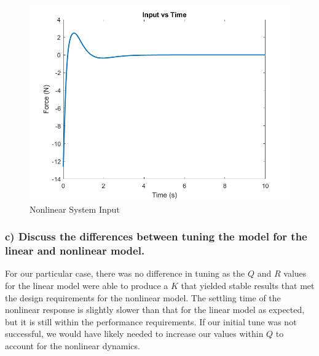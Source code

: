 \begin{figure}[!ht]
    \centering
    \includegraphics[width=\linewidth]{figs/sf_nlin_input.png}
    \caption{Nonlinear System Input}
    \label{}
\end{figure}

\clearpage

\subsubsection*{c) Discuss the differences between tuning the model for the linear and nonlinear model.}

For our particular case, there was no difference in tuning as the $Q$ and $R$ values for the linear model were able to produce a $K$ that yielded stable results that met the design requirements for the nonlinear model. The settling time of the nonlinear response is slightly slower than that for the linear model as expected, but it is still within the performance requirements. If our initial tune was not successful, we would have likely needed to increase our values within $Q$ to account for the nonlinear dynamics.
